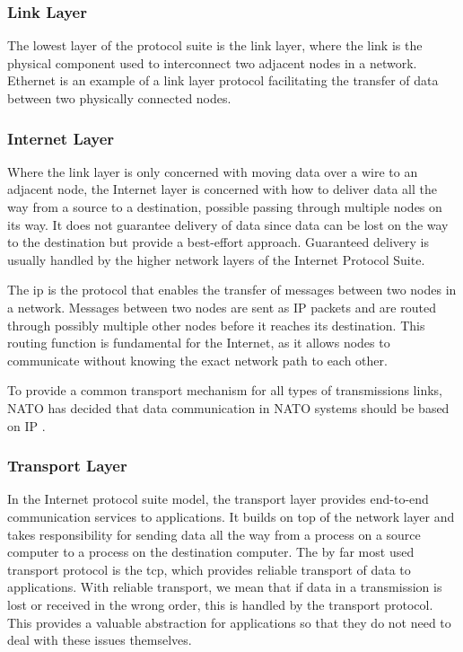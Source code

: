 \subsubsection{Link Layer}

The lowest layer of the protocol suite is the link layer, where the link is the
physical component used to interconnect two adjacent nodes in a network.
Ethernet is an example of a link layer protocol facilitating the transfer of
data between two physically connected nodes.

\subsubsection{Internet Layer}

 Where the link layer is only concerned with moving data over a wire to an
 adjacent node, the Internet layer is concerned with how to deliver data all the
 way from a source to a destination, possible passing through multiple nodes on
 its way. It does not guarantee delivery of data since data can be lost on the
 way to the destination but provide a best-effort approach. Guaranteed delivery is
 usually handled by the higher network layers of the Internet Protocol Suite.

 The \gls{ip} is the protocol that enables the transfer of messages between two
 nodes in a network. Messages between two nodes are sent as IP packets and are
 routed through possibly multiple other nodes before it reaches its destination.
 This routing function is fundamental for the Internet, as it allows nodes to
 communicate without knowing the exact network path to each other.

To provide a common transport mechanism for all types of transmissions links,
NATO has decided that data communication in NATO systems should be based on IP
\cite{nnec-study}.


 \subsubsection{Transport Layer}

In the Internet protocol suite model, the transport layer provides end-to-end
communication services to applications. It builds on top of the network layer
and takes responsibility for sending data all the way from a process on a source
computer to a process on the destination computer. The by far most used
transport protocol is the \gls{tcp}, which provides reliable transport of data
to applications. With reliable transport, we mean that if data in a transmission
is lost or received in the wrong order, this is handled by the transport
protocol. This provides a valuable abstraction for applications so that they
do not need to deal with these issues themselves.

